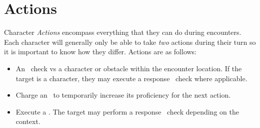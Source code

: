 \section{Actions}\label{sec:actions}
Character \emph{Actions} encompass everything that they can do during encounters. Each character will generally only be able to take \emph{two} actions during their turn so it is important to know how they differ. Actions are as follows:
\begin{itemize}
	\item An \attribute\ check vs a character or obstacle within the encounter location. If the target is a character, they may execute a response \attribute\ check where applicable.
	\item Charge an \attribute\ to temporarily increase its proficiency for the next action.
	\item Execute a \techn{}. The target may perform a response \attribute\ check depending on the context.
\end{itemize}